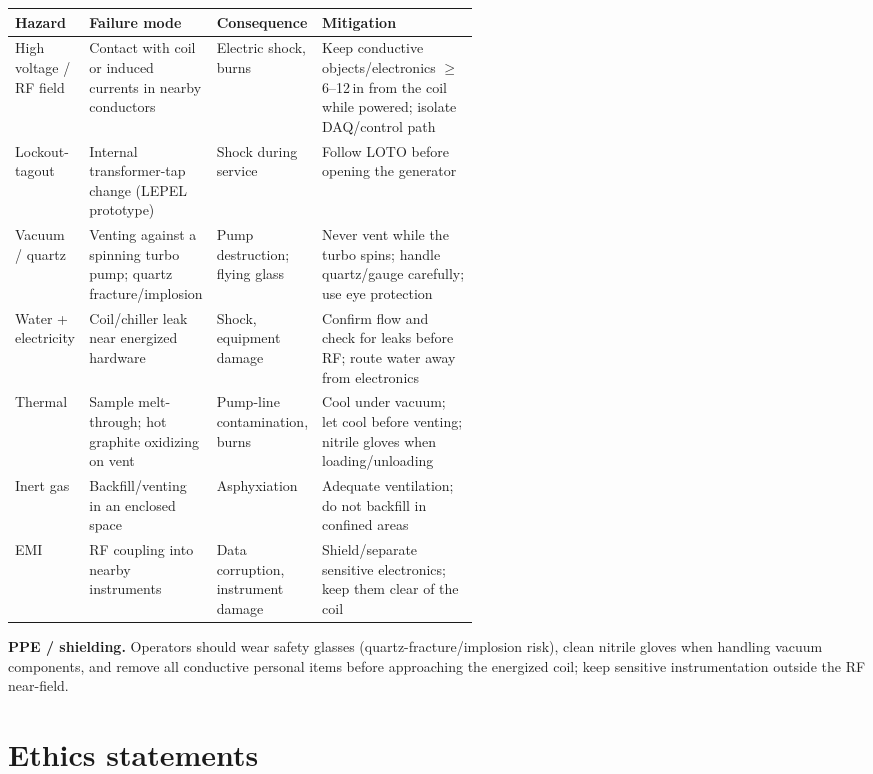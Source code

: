 \documentclass[5p,times]{elsarticle}
\begin{document}
\begin{table}[ht]
\small
\begin{tabularx}{\linewidth}{L{0.16\linewidth} L{0.22\linewidth} L{0.16\linewidth} X}
\toprule
\textbf{Hazard} & \textbf{Failure mode} & \textbf{Consequence} & \textbf{Mitigation} \\
\midrule
High voltage / RF field & Contact with coil or induced currents in nearby conductors & Electric shock, burns & Keep conductive objects/electronics $\ge$6--12\,in from the coil while powered; isolate DAQ/control path \\
Lockout-tagout & Internal transformer-tap change (LEPEL prototype) & Shock during service & Follow LOTO before opening the generator \\
Vacuum / quartz & Venting against a spinning turbo pump; quartz fracture/implosion & Pump destruction; flying glass & Never vent while the turbo spins; handle quartz/gauge carefully; use eye protection \\
Water + electricity & Coil/chiller leak near energized hardware & Shock, equipment damage & Confirm flow and check for leaks before RF; route water away from electronics \\
Thermal & Sample melt-through; hot graphite oxidizing on vent & Pump-line contamination, burns & Cool under vacuum; let cool before venting; nitrile gloves when loading/unloading \\
Inert gas & Backfill/venting in an enclosed space & Asphyxiation & Adequate ventilation; do not backfill in confined areas \\
EMI & RF coupling into nearby instruments & Data corruption, instrument damage & Shield/separate sensitive electronics; keep them clear of the coil \\
\bottomrule
\end{tabularx}
\end{table}

\textbf{PPE / shielding.} Operators should wear safety glasses
(quartz-fracture/implosion risk), clean nitrile gloves when handling vacuum
components, and remove all conductive personal items before approaching the energized
coil; keep sensitive instrumentation outside the RF near-field.

\section{Ethics statements}
\end{document}
